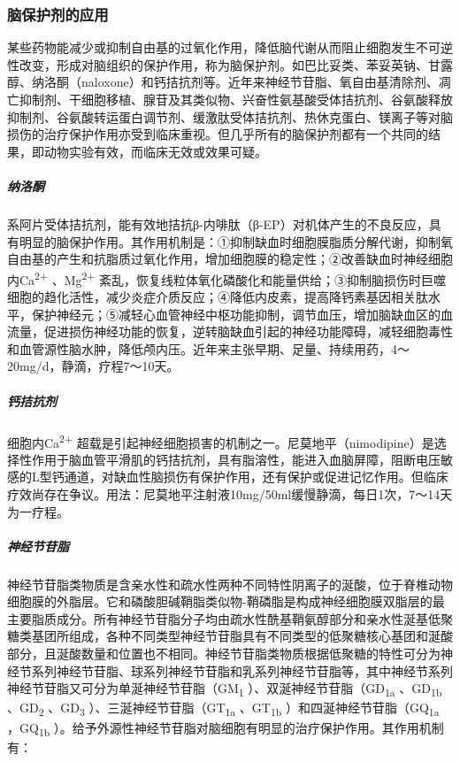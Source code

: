 \subsubsection{脑保护剂的应用}

某些药物能减少或抑制自由基的过氧化作用，降低脑代谢从而阻止细胞发生不可逆性改变，形成对脑组织的保护作用，称为脑保护剂。如巴比妥类、苯妥英钠、甘露醇、纳洛酮（naloxone）和钙拮抗剂等。近年来神经节苷脂、氧自由基清除剂、凋亡抑制剂、干细胞移植、腺苷及其类似物、兴奋性氨基酸受体拮抗剂、谷氨酸释放抑制剂、谷氨酸转运蛋白调节剂、缓激肽受体拮抗剂、热休克蛋白、镁离子等对脑损伤的治疗保护作用亦受到临床重视。但几乎所有的脑保护剂都有一个共同的结果，即动物实验有效，而临床无效或效果可疑。

\subparagraph{纳洛酮}

系阿片受体拮抗剂，能有效地拮抗β-内啡肽（β-EP）对机体产生的不良反应，具有明显的脑保护作用。其作用机制是：①抑制缺血时细胞膜脂质分解代谢，抑制氧自由基的产生和抗脂质过氧化作用，增加细胞膜的稳定性；②改善缺血时神经细胞内Ca\textsuperscript{2+}
、Mg\textsuperscript{2+}
紊乱，恢复线粒体氧化磷酸化和能量供给；③抑制脑损伤时巨噬细胞的趋化活性，减少炎症介质反应；④降低内皮素，提高降钙素基因相关肽水平，保护神经元；⑤减轻心血管神经中枢功能抑制，调节血压，增加脑缺血区的血流量，促进损伤神经功能的恢复，逆转脑缺血引起的神经功能障碍，减轻细胞毒性和血管源性脑水肿，降低颅内压。近年来主张早期、足量、持续用药，4～20mg/d，静滴，疗程7～10天。

\subparagraph{钙拮抗剂}

细胞内Ca\textsuperscript{2+}
超载是引起神经细胞损害的机制之一。尼莫地平（nimodipine）是选择性作用于脑血管平滑肌的钙拮抗剂，具有脂溶性，能进入血脑屏障，阻断电压敏感的L型钙通道，对缺血性脑损伤有保护作用，还有保护或促进记忆作用。但临床疗效尚存在争议。用法：尼莫地平注射液10mg/50ml缓慢静滴，每日1次，7～14天为一疗程。

\subparagraph{神经节苷脂}

神经节苷脂类物质是含亲水性和疏水性两种不同特性阴离子的涎酸，位于脊椎动物细胞膜的外脂层。它和磷酸胆碱鞘脂类似物-鞘磷脂是构成神经细胞膜双脂层的最主要脂质成分。所有神经节苷脂分子均由疏水性酰基鞘氨醇部分和亲水性涎基低聚糖类基团所组成，各种不同类型神经节苷脂具有不同类型的低聚糖核心基团和涎酸部分，且涎酸数量和位置也不相同。神经节苷脂类物质根据低聚糖的特性可分为神经节系列神经节苷脂、球系列神经节苷脂和乳系列神经节苷脂等，其中神经节系列神经节苷脂又可分为单涎神经节苷脂（GM\textsubscript{1}
）、双涎神经节苷脂（GD\textsubscript{1a} 、GD\textsubscript{1b}
、GD\textsubscript{2} 、GD\textsubscript{3}
）、三涎神经节苷脂（GT\textsubscript{1a} 、GT\textsubscript{1b}
）和四涎神经节苷脂（GQ\textsubscript{1a} ，GQ\textsubscript{1b}
）。给予外源性神经节苷脂对脑细胞有明显的治疗保护作用。其作用机制有：

